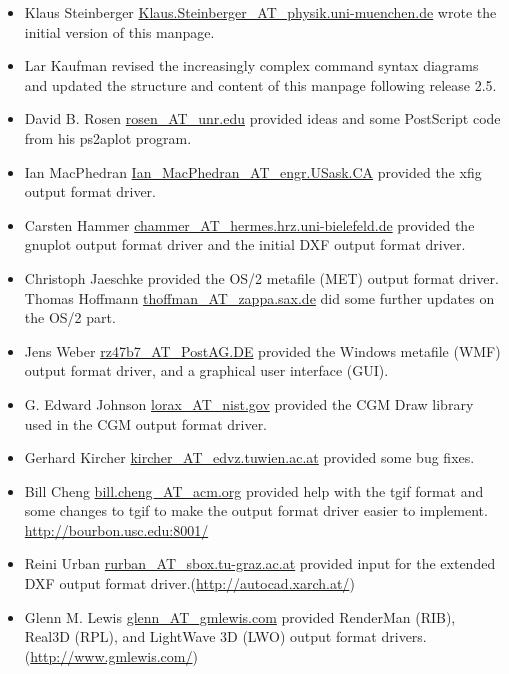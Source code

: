 \documentclass[english,a4paper]{article}
\let\URL\url \let\Email\url \let\File\url
\begin{document}
\begin{itemize}\setlength{\itemsep}{0cm}

  \item Klaus Steinberger \Email{Klaus.Steinberger_AT_physik.uni-muenchen.de}
     wrote the initial version of this manpage.

  \item Lar Kaufman revised the increasingly complex
     command syntax diagrams and updated the structure and content of this
     manpage following release 2.5. 

  \item David B. Rosen \Email{rosen_AT_unr.edu} provided ideas and some PostScript
     code from his ps2aplot program.

  \item Ian MacPhedran \Email{Ian_MacPhedran_AT_engr.USask.CA} provided the xfig
     output format driver.

  \item Carsten Hammer \Email{chammer_AT_hermes.hrz.uni-bielefeld.de} provided the
     gnuplot output format driver and the initial DXF output format driver.

  \item Christoph Jaeschke provided the OS/2 metafile (MET) output format driver. 
  Thomas Hoffmann \Email{thoffman_AT_zappa.sax.de} did some further updates on the OS/2 part.

  \item Jens Weber \Email{rz47b7_AT_PostAG.DE} provided the Windows metafile (WMF)
     output format driver, and a graphical user interface (GUI).

  \item G. Edward Johnson \Email{lorax_AT_nist.gov} provided the CGM Draw library
     used in the CGM output format driver.

  \item Gerhard Kircher \Email{kircher_AT_edvz.tuwien.ac.at} provided some bug
     fixes.

  \item Bill Cheng \Email{bill.cheng_AT_acm.org} provided help with the tgif
     format and some changes to tgif to make the output format driver easier to implement.
     \URL{http://bourbon.usc.edu:8001/}

  \item Reini Urban \Email{rurban_AT_sbox.tu-graz.ac.at} provided input for the
     extended DXF output format driver.(\URL{http://autocad.xarch.at/})

  \item Glenn M. Lewis \Email{glenn_AT_gmlewis.com} provided RenderMan (RIB),
     Real3D (RPL), and LightWave 3D (LWO) output format drivers.
     (\URL{http://www.gmlewis.com/})


\end{itemize}
\end{document}

